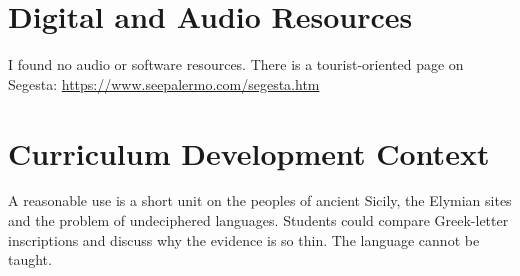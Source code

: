 \documentclass[12pt]{article}
\begin{document}
\section{Digital and Audio Resources}
I found no audio or software resources. There is a tourist-oriented page on Segesta: \url{https://www.seepalermo.com/segesta.htm}

\section{Curriculum Development Context}
A reasonable use is a short unit on the peoples of ancient Sicily, the Elymian sites and the problem of undeciphered languages. Students could compare Greek-letter inscriptions and discuss why the evidence is so thin. The language cannot be taught.
\end{document}
